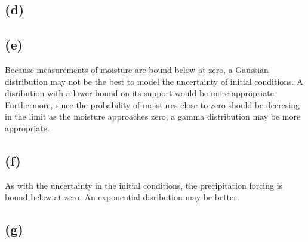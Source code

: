 \documentclass[fleqn, letterpaper]{tufte-handout}
\begin{document}
\subsection{(d)}

\subsection{(e)}

Because measurements of moisture are bound below at zero, a Gaussian distribution may not be the best to model the uncertainty of initial conditions. A disribution with a lower bound on its support would be more appropriate. Furthermore, since the probability of moistures close to zero should be decresing in the limit as the moisture approaches zero, a gamma distribution may be more appropriate.

\subsection{(f)}

As with the uncertainty in the initial conditions, the precipitation forcing is bound below at zero. An exponential disribution may be better. 

\subsection{(g)}
\end{document}
